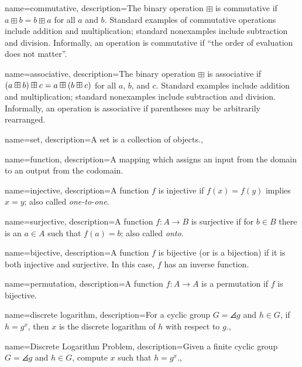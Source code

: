 {
    name={commutative},
    description={The binary operation $\boxplus$ is commutative if
        $a\boxplus b = b\boxplus a$ for all $a$ and $b$.
        Standard examples of commutative operations include addition
        and multiplication;
        standard nonexamples include subtraction and division.
        Informally, an operation is commutative if
        ``the order of evaluation does not matter''.}
}

{
    name={associative},
    description={The binary operation $\boxplus$ is associative if
        $\left( a\boxplus b \right)\boxplus c = a\boxplus \left( b\boxplus c \right)$
        for all $a$, $b$, and $c$.
        Standard examples include addition and multiplication;
        standard nonexamples include subtraction and division.
        Informally, an operation is associative if parentheses may be
        arbitrarily rearranged.}
}

{
    name={set},
    description={A set is a collection of objects.},
}

{
    name={function},
    description={A mapping which assigns an input from the domain
        to an output from the codomain.}
}

{
    name={injective},
    description={A function $f$ is injective if $f(x) = f(y)$
        implies $x=y$; also called \emph{one-to-one}.}
}

{
    name={surjective},
    description={A function $f:A\to B$ is surjective if for $b\in B$
        there is an $a\in A$ such that $f(a)=b$; also called \emph{onto}.}
}

{
    name={bijective},
    description={A function $f$ is bijective (or is a bijection) if it is
        both \gls{injective} and \gls{surjective}.
        In this case, $f$ has an inverse function.}
}

{
    name={permutation},
    description={A function $f:A\to A$ is a permutation if $f$
        is \gls{bijective}.}
}

{
    name={discrete logarithm},
    description={For a \gls{cyclic group} $G = \angles{g}$
        and $h\in G$, if $h = g^{x}$, then $x$ is the discrete logarithm
        of $h$ with respect to $g$.},
}

{
    name={Discrete Logarithm Problem},
    description={Given a \gls{finite cyclic group} $G = \angles{g}$
        and $h\in G$, compute $x$ such that $h = g^{x}$.},
}


